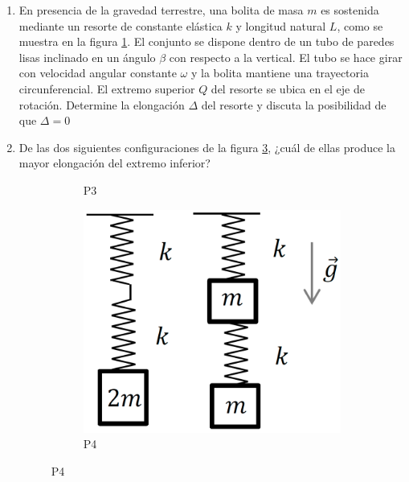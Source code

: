 \documentclass[letterpaper,11pt]{article}
\begin{document}
\begin{enumerate}

\item En presencia de la gravedad terrestre, una bolita de masa $m$ es sostenida mediante un resorte de constante elástica $k$ y longitud natural $L$, como se muestra en la figura \ref{fig:p3}. El conjunto se dispone dentro de un tubo de paredes lisas inclinado en un ángulo $\beta$ con respecto a la vertical. El tubo se hace girar con velocidad angular constante $\omega$ y la bolita mantiene una trayectoria circunferencial. El extremo superior $Q$ del resorte se ubica en el eje de rotación. Determine la elongación $\Delta$ del resorte y discuta la posibilidad de que $\Delta = 0$

\item De las dos siguientes configuraciones de la figura \ref{fig:p4}, ¿cuál de ellas produce la mayor elongación del extremo inferior?

\begin{figure}[H]
    \centering
    \begin{subfigure}[t]{0.45\textwidth}
        \centering
        
        \caption{P3}
        \label{fig:p3}
    \end{subfigure}
    \begin{subfigure}[t]{0.45\textwidth}
        \centering
        \includegraphics[scale=0.2]{2021-2/img/aux6/resortes.png}
        \caption{P4}
        \label{fig:p4}
    \end{subfigure}
\end{figure}


\end{enumerate}
\end{document}
